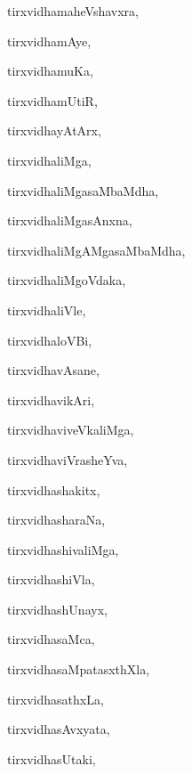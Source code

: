 \begin{multicols}{3}
{\noindent
{tirxvidhamaheVshavxra}, \pageref{tirxvidhamaheVshavxra}

\noindent
{tirxvidhamAye}, \pageref{tirxvidhamAye}

\noindent
{tirxvidhamuKa}, \pageref{tirxvidhamuKa}

\noindent
{tirxvidhamUtiR}, \pageref{tirxvidhamUtiR}

\noindent
{tirxvidhayAtArx}, \pageref{tirxvidhayAtArx}

\noindent
{tirxvidhaliMga}, \pageref{tirxvidhaliMga}

\noindent
{tirxvidhaliMgasaMbaMdha}, \pageref{tirxvidhaliMgasaMbaMdha}

\noindent
{tirxvidhaliMgasAnxna}, \pageref{tirxvidhaliMgasAnxna}

\noindent
{tirxvidhaliMgAMgasaMbaMdha}, \pageref{tirxvidhaliMgAMgasaMbaMdha}

\noindent
{tirxvidhaliMgoVdaka}, \pageref{tirxvidhaliMgoVdaka}

\noindent
{tirxvidhaliVle}, \pageref{tirxvidhaliVle}

\noindent
{tirxvidhaloVBi}, \pageref{tirxvidhaloVBi}

\noindent
{tirxvidhavAsane}, \pageref{tirxvidhavAsane}

\noindent
{tirxvidhavikAri}, \pageref{tirxvidhavikAri}

\noindent
{tirxvidhaviveVkaliMga}, \pageref{tirxvidhaviveVkaliMga}

\noindent
{tirxvidhaviVrasheYva}, \pageref{tirxvidhaviVrasheYva}

\noindent
{tirxvidhashakitx}, \pageref{tirxvidhashakitx}

\noindent
{tirxvidhasharaNa}, \pageref{tirxvidhasharaNa}

\noindent
{tirxvidhashivaliMga}, \pageref{tirxvidhashivaliMga}

\noindent
{tirxvidhashiVla}, \pageref{tirxvidhashiVla}

\noindent
{tirxvidhashUnayx}, \pageref{tirxvidhashUnayx}

\noindent
{tirxvidhasaMca}, \pageref{tirxvidhasaMca}

\noindent
{tirxvidhasaMpatasxthXla}, \pageref{tirxvidhasaMpatasxthXla}

\noindent
{tirxvidhasathxLa}, \pageref{tirxvidhasathxLa}

\noindent
{tirxvidhasAvxyata}, \pageref{tirxvidhasAvxyata}

\noindent
{tirxvidhasUtaki}, \pageref{tirxvidhasUtaki}

}
\end{multicols}
